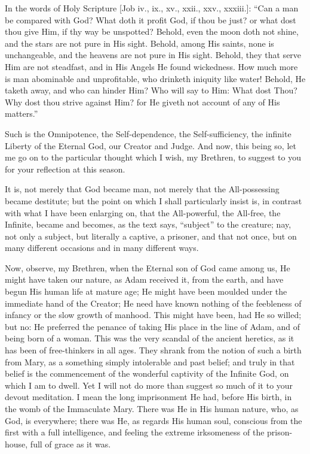 In the words of Holy Scripture [Job iv., ix., xv.,
xxii., xxv., xxxiii.]: ``Can a man be compared with
God? What doth it profit God, if thou be just? or what
dost thou give Him, if thy way be unspotted? Behold, even
the moon doth not shine, and the stars are not pure in
His sight. Behold, among His saints, none is
unchangeable, and the heavens are not pure in His sight.
Behold, they that serve Him are not steadfast, and in His
Angels He found wickedness. How much more is man
abominable and unprofitable, who drinketh iniquity like
water! Behold, He taketh away, and who can hinder Him?
Who will say to Him: What dost Thou? Why dost thou strive
against Him? for He giveth not account of any of His
matters.''

Such is the Omnipotence, the Self-dependence, the
Self-sufficiency, the infinite Liberty of the Eternal
God, our Creator and Judge. And now, this being so, let
me go on to the particular thought which I wish, my
Brethren, to suggest to you for your reflection at this
season.

It is, not merely that God became man, not merely
that the All-possessing became destitute; but the point
on which I shall particularly insist is, in contrast with
what I have been enlarging on, that the All-powerful, the
All-free, the Infinite, became and becomes, as the text
says, ``subject'' to the creature; nay, not only
a subject, but literally a captive, a prisoner, and that
not once, but on many different occasions and in many
different ways.

Now, observe, my Brethren, when the Eternal son of God
came among us, He might have taken our nature, as Adam
received it, from the earth, and have begun His human
life at mature age; He might have been moulded under the
immediate hand of the Creator; He need have known nothing
of the feebleness of infancy or the slow growth of
manhood. This might have been, had He so willed; but no:
He preferred the penance of taking His place in the line
of Adam, and of being born of a woman. This was the very
scandal of the ancient heretics, as it has been of
free-thinkers in all ages. They shrank from the notion of
such a birth from Mary, as a something simply intolerable
and past belief; and truly in that belief is the
commencement of the wonderful captivity of the Infinite
God, on which I am to dwell. Yet I will not do more than
suggest so much of it to your devout meditation. I mean
the long imprisonment He had, before His birth, in the
womb of the Immaculate Mary. There was He in His human
nature, who, as God, is everywhere; there was He, as
regards His human soul, conscious from the first with a
full intelligence, and feeling the extreme irksomeness of
the prison-house, full of grace as it was.

